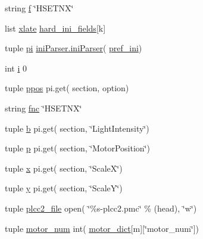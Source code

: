 \begin{DoxyCompactItemize}
\item 
string \hyperlink{namespacemk__pgpmac__redis_a057fe7457503e0de97edcf855591ed58}{f} \char`\"{}H\-S\-E\-T\-N\-X\char`\"{}
\item 
list \hyperlink{namespacemk__pgpmac__redis_afba647feb8fc4d0a364c3dca29af3a22}{xlate} \hyperlink{namespacemk__pgpmac__redis_a8257226983aee079ec66f5cc67e194ec}{hard\-\_\-ini\-\_\-fields}\mbox{[}k\mbox{]}
\item 
tuple \hyperlink{namespacemk__pgpmac__redis_a2f5bbda0250eecd94d166dc0a2fbff86}{pi} \hyperlink{classiniParser_1_1iniParser}{ini\-Parser.\-ini\-Parser}( \hyperlink{namespacemk__pgpmac__redis_a38c785af5201403976e1267c47ea5096}{pref\-\_\-ini})
\item 
int \hyperlink{namespacemk__pgpmac__redis_afa643a23a5984fe44c2182ada3dfa401}{i} 0
\item 
tuple \hyperlink{namespacemk__pgpmac__redis_ad9356b4b4c48789f17e6e8fd682e2798}{ppos} pi.\-get( section, option)
\item 
string \hyperlink{namespacemk__pgpmac__redis_a654b54ba0758b8b84516938260851129}{fnc} \char`\"{}H\-S\-E\-T\-N\-X\char`\"{}
\item 
tuple \hyperlink{namespacemk__pgpmac__redis_a90faa2042277e396b48b19374c9db4ab}{b} pi.\-get( section, \char`\"{}Light\-Intensity\char`\"{})
\item 
tuple \hyperlink{namespacemk__pgpmac__redis_a11daf2847f2dc94562b5b61b3f412574}{p} pi.\-get( section, \char`\"{}Motor\-Position\char`\"{})
\item 
tuple \hyperlink{namespacemk__pgpmac__redis_abc8696f6f2f3fd3edd30989d3c8ec301}{x} pi.\-get( section, \char`\"{}Scale\-X\char`\"{})
\item 
tuple \hyperlink{namespacemk__pgpmac__redis_a34220d58136fb95853f54ed51a130f79}{y} pi.\-get( section, \char`\"{}Scale\-Y\char`\"{})
\item 
tuple \hyperlink{namespacemk__pgpmac__redis_a950307aae727f0afc8120ab03445b411}{plcc2\-\_\-file} open( \char`\"{}\%s-\/plcc2.\-pmc\char`\"{} \% (head), \char`\"{}w\char`\"{})
\item 
tuple \hyperlink{namespacemk__pgpmac__redis_a292515b2acabb0dcade5b16584cdb011}{motor\-\_\-num} int( \hyperlink{namespacemk__pgpmac__redis_ad8583d4fe88c4c98af73d2858c51c660}{motor\-\_\-dict}\mbox{[}m\mbox{]}\mbox{[}\char`\"{}motor\-\_\-num\char`\"{}\mbox{]})
\end{DoxyCompactItemize}


